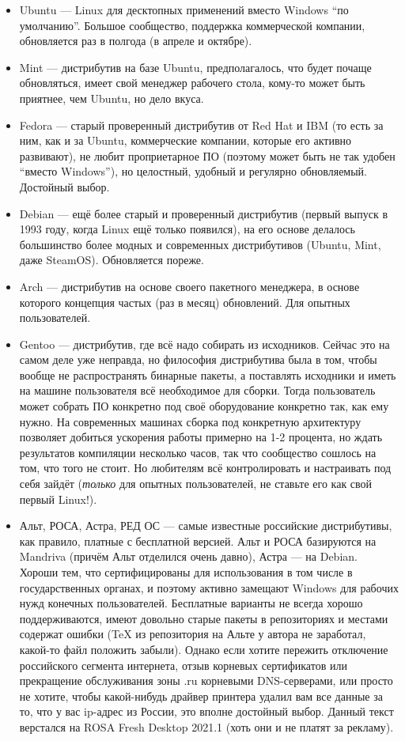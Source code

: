 \documentclass{../../text-style}
\begin{document}
\begin{itemize}
    \item Ubuntu --- Linux для десктопных применений вместо Windows \enquote{по умолчанию}. 
        Большое сообщество, поддержка коммерческой компании, обновляется раз в полгода (в апреле и октябре).
    \item Mint --- дистрибутив на базе Ubuntu, предполагалось, что будет почаще обновляться, имеет свой менеджер рабочего стола, кому-то может быть приятнее, чем Ubuntu, но дело вкуса.
    \item Fedora --- старый проверенный дистрибутив от Red Hat и IBM (то есть за ним, как и за Ubuntu, коммерческие компании, которые его активно развивают), не любит проприетарное ПО (поэтому может быть не так удобен \enquote{вместо Windows}), но целостный, удобный и регулярно обновляемый. Достойный выбор.
    \item Debian --- ещё более старый и проверенный дистрибутив (первый выпуск в 1993 году, когда Linux ещё только появился), на его основе делалось большинство более модных и современных дистрибутивов (Ubuntu, Mint, даже SteamOS).
        Обновляется пореже.
    \item Arch --- дистрибутив на основе своего пакетного менеджера, в основе которого концепция частых (раз в месяц) обновлений.
        Для опытных пользователей.
    \item Gentoo --- дистрибутив, где всё надо собирать из исходников.
        Сейчас это на самом деле уже неправда, но философия дистрибутива была в том, чтобы вообще не распространять бинарные пакеты, а поставлять исходники и иметь на машине пользователя всё необходимое для сборки.
        Тогда пользователь может собрать ПО конкретно под своё оборудование конкретно так, как ему нужно.
        На современных машинах сборка под конкретную архитектуру позволяет добиться ускорения работы примерно на 1-2 процента, но ждать результатов компиляции несколько часов, так что сообщество сошлось на том, что того не стоит.
        Но любителям всё контролировать и настраивать под себя зайдёт (\emph{только} для опытных пользователей, не ставьте его как свой первый Linux!).
    \item Альт, РОСА, Астра, РЕД ОС --- самые известные российские дистрибутивы, как правило, платные с бесплатной версией.
        Альт и РОСА базируются на Mandriva (причём Альт отделился очень давно), Астра --- на Debian.
        Хороши тем, что сертифицированы для использования в том числе в государственных органах, и поэтому активно замещают Windows для рабочих нужд конечных пользователей.
        Бесплатные варианты не всегда хорошо поддерживаются, имеют довольно старые пакеты в репозиториях и местами содержат ошибки (TeX из репозитория на Альте у автора не заработал, какой-то файл положить забыли).
        Однако если хотите пережить отключение российского сегмента интернета, отзыв корневых сертификатов или прекращение обслуживания зоны .ru корневыми DNS-серверами, или просто не хотите, чтобы какой-нибудь драйвер принтера удалил вам все данные за то, что у вас ip-адрес из России, это вполне достойный выбор.
        Данный текст верстался на ROSA Fresh Desktop 2021.1 (хоть они и не платят за рекламу).
\end{itemize}
\end{document}
